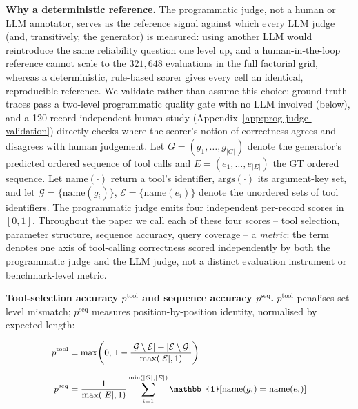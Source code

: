 \noindent\textbf{Why a deterministic reference.} The programmatic judge, not a human or LLM annotator, serves as the reference signal against which every LLM judge (and, transitively, the generator) is measured: using another LLM would reintroduce the same reliability question one level up, and a human-in-the-loop reference cannot scale to the $321{,}648$ evaluations in the full factorial grid, whereas a deterministic, rule-based scorer gives every cell an identical, reproducible reference. We validate rather than assume this choice: ground-truth traces pass a two-level programmatic quality gate with no LLM involved (below), and a 120-record independent human study (Appendix~\ref{app:prog-judge-validation}) directly checks where the scorer's notion of correctness agrees and disagrees with human judgement. Let $G = (g_1, \dots, g_{|G|})$ denote the generator's predicted ordered sequence of tool calls and $E = (e_1, \dots, e_{|E|})$ the GT ordered sequence. Let $\mathrm{name}(\cdot)$ return a tool's identifier, $\mathrm{args}(\cdot)$ its argument-key set, and let $\mathcal{G} = \{\mathrm{name}(g_i)\}$, $\mathcal{E} = \{\mathrm{name}(e_i)\}$ denote the unordered sets of tool identifiers. The programmatic judge emits four independent per-record scores in $[0, 1]$. Throughout the paper we call each of these four scores -- tool selection, parameter structure, sequence accuracy, query coverage -- a \emph{metric}: the term denotes one axis of tool-calling correctness scored independently by both the programmatic judge and the LLM judge, not a distinct evaluation instrument or benchmark-level metric.

\textbf{Tool-selection accuracy $p^{\text{tool}}$ and sequence accuracy $p^{\text{seq}}$.}
$p^{\text{tool}}$ penalises set-level mismatch; $p^{\text{seq}}$ measures position-by-position identity, normalised by expected length:

\vspace{-0.4cm}
\begin{subequations}
\small
\begin{align}
p^{\text{tool}}
&=
\max\!\left(
0,\,
1
-
\frac{
|\mathcal{G} \setminus \mathcal{E}|
+
|\mathcal{E} \setminus \mathcal{G}|
}{
\max(|\mathcal{E}|,1)
}
\right)
\label{eq:prog-tool}
\\[6pt]
p^{\text{seq}}
&=
\frac{1}{\max(|E|,1)}
\sum_{i=1}^{\min(|G|,|E|)}
\mathbb{1}\!\left[
\mathrm{name}(g_i)
=
\mathrm{name}(e_i)
\right]
\label{eq:prog-seq}
\end{align}
\vspace{-0.2cm}
\end{subequations}

